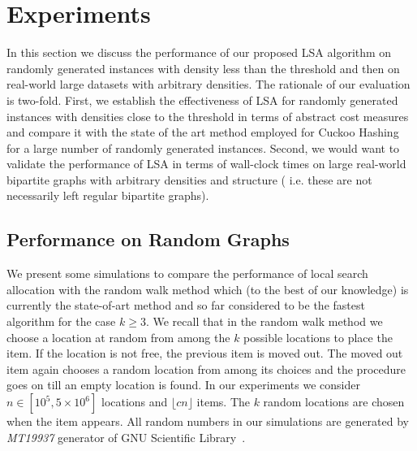 \section{Experiments}

In this section we discuss the performance of our proposed LSA algorithm on randomly generated instances with density less than the threshold and then on real-world large datasets with arbitrary densities.
 The rationale of our evaluation is two-fold. First, we establish the effectiveness of LSA for randomly generated instances with densities close to the threshold in terms of abstract cost measures and compare it with the state of the art method employed for Cuckoo Hashing for a large number of randomly generated instances. Second, we would want to validate the performance of LSA in terms of wall-clock times on large real-world bipartite graphs with arbitrary densities and structure ( i.e. these are not necessarily left regular bipartite graphs). 
 
\subsection{Performance on Random Graphs}

We present some simulations to compare the performance of local search allocation with the random walk method which (to the best of our knowledge) is currently the state-of-art method and so far considered to be the fastest algorithm for the case $k\ge 3$. We recall that in the random walk method we choose a location at random from among the $k$ possible locations to place the item. If the location is not free, the previous item is moved out.  The moved out item again chooses a random location from among its choices and the procedure goes on till an empty location is found. In our experiments we consider $n\in [10^5, 5\times 10^6]$ locations and $\lfloor cn \rfloor$ items. The $k$ random locations are chosen when the item appears. All random numbers in our simulations are generated by \emph{MT19937} generator of GNU Scientific Library~\cite{gnu}. 

